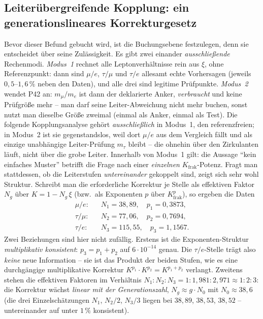 \subsection{Leiterübergreifende Kopplung: ein generationslineares Korrekturgesetz}
Bevor dieser Befund gebucht wird, ist die Buchungsebene festzulegen, denn
sie entscheidet über seine Zulässigkeit. Es gibt zwei einander
\emph{ausschließende} Rechenmodi. \emph{Modus~1} rechnet alle
Leptonverhältnisse rein aus $\xi$, ohne Referenzpunkt: dann sind $\mu/e$,
$\tau/\mu$ und $\tau/e$ allesamt echte Vorhersagen (jeweils $0{,}5$--$1{,}6\,\%$
neben den Daten), und alle drei sind legitime Prüfpunkte. \emph{Modus~2}
wendet P42 an: $m_\mu/m_e$ ist dann der deklarierte Anker, \emph{verbraucht}
und keine Prüfgröße mehr -- man darf seine Leiter-Abweichung nicht mehr
buchen, sonst nutzt man dieselbe Größe zweimal (einmal als Anker, einmal als
Test). Die folgende Kopplungsanalyse gehört \emph{ausschließlich} in
Modus~1, den referenzfreien; in Modus~2 ist sie gegenstandslos, weil dort
$\mu/e$ aus dem Vergleich fällt und als einzige unabhängige Leiter-Prüfung
$m_\tau$ bleibt -- die ohnehin über den Zirkulanten läuft, nicht über die
grobe Leiter. Innerhalb von Modus~1 gilt: die Aussage \enquote{kein
einfaches Muster} betrifft die Frage nach einer \emph{einzelnen}
$K_{\text{frak}}$-Potenz. Fragt man stattdessen, ob die
Leiterstufen \emph{untereinander} gekoppelt sind, zeigt sich sehr wohl
Struktur. Schreibt man die erforderliche Korrektur je Stelle als effektiven
Faktor $N_g$ über $K=1-N_g\,\xi$ (bzw.\ als Exponenten $p$ über
$K_{\text{frak}}^{p}$), so ergeben die Daten
\begin{align}
  \text{$\mu/e$:}\quad & N_1 = 38{,}89,\quad p_1 = 0{,}3873,\\
  \text{$\tau/\mu$:}\quad & N_2 = 77{,}06,\quad p_2 = 0{,}7694,\\
  \text{$\tau/e$:}\quad & N_3 = 115{,}55,\quad p_3 = 1{,}1567.
\end{align}
Zwei Beziehungen sind hier nicht zufällig. Erstens ist die
Exponenten-Struktur \emph{multiplikativ konsistent}: $p_3 = p_1+p_2$ auf
$6\cdot10^{-14}$ genau. Die $\tau/e$-Stelle trägt also \emph{keine} neue
Information -- sie ist das Produkt der beiden Stufen, wie es eine
durchgängige multiplikative Korrektur $K^{p_1}\cdot K^{p_2}=K^{p_1+p_2}$
verlangt. Zweitens stehen die effektiven Faktoren im Verhältnis
$N_1:N_2:N_3 = 1:1{,}981:2{,}971 \approx 1:2:3$: die Korrektur wächst
\emph{linear mit der Generationszahl}, $N_g \approx g\cdot N_0$ mit
$N_0 \approx 38{,}6$ (die drei Einzelschätzungen $N_1$, $N_2/2$, $N_3/3$
liegen bei $38{,}89$, $38{,}53$, $38{,}52$ -- untereinander auf unter
$1\,\%$ konsistent).

